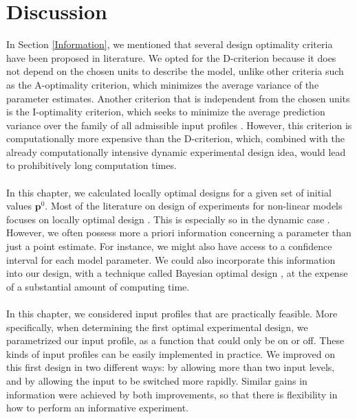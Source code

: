 \section{Discussion}
\label{Discussion}
{\color{red}In Section \ref{Information}, we mentioned that several design optimality criteria have been proposed in literature. We opted for the D-criterion because it does not depend on the chosen units to describe the model, unlike other criteria such as the A-optimality criterion, which minimizes the average variance of the parameter estimates.} Another criterion that is independent from the chosen units is the I-optimality criterion, which seeks to minimize the average prediction variance over the family of all admissible input profiles {\color{red} \parencite{goos1}}. However, this criterion is computationally more expensive than the D-criterion, which, combined with the already computationally intensive dynamic experimental design idea, would lead to prohibitively long computation times.
\\
\\
In this chapter, we calculated locally optimal designs for a given set of initial values $\mathbf{p}^0$.  Most of the literature on design of experiments for non-linear models focuses on locally optimal design \parencite{fedorov}. This is especially so in the dynamic case \parencite{bernaerts1,bernaerts2,balsa1,balsa2,nahor1,nahor2}. However, we often possess more a priori information concerning a parameter than just a point estimate. For instance, we might also have access to a confidence interval for each model parameter. We could also incorporate this information into our design, with a technique called Bayesian optimal design \parencite{chaloner}, at the expense of a substantial amount of computing time. 
\\
\\
In this chapter, we considered input profiles that are practically feasible. More specifically, when determining the first optimal experimental design, we parametrized our input profile, as a function that could only be on or off. These kinds of input profiles can be easily implemented in practice. We improved on this first design in two different ways: by allowing more than two input levels, and by allowing the input to be switched more rapidly. Similar gains in information were achieved by both improvements, so that there is flexibility in how to perform an informative experiment.
\\
\\
